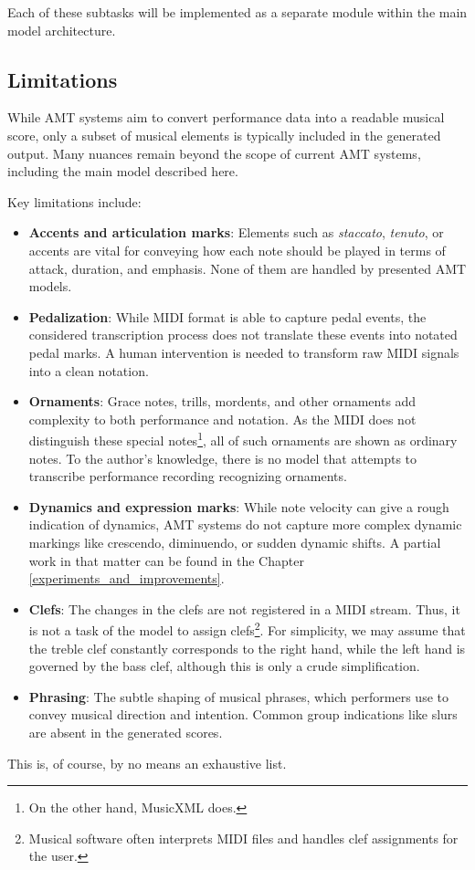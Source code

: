 Each of these subtasks will be implemented as a separate module within the main model architecture.

\subsection{Limitations}

While AMT systems aim to convert performance data into a readable musical score, only a subset of musical elements is typically included in the generated output. Many nuances remain beyond the scope of current AMT systems, including the main model described here.

Key limitations include: \begin{itemize}
	\item {\bf Accents and articulation marks}: Elements such as \emph{staccato}, \emph{tenuto}, or accents are vital for conveying how each note should be played in terms of attack, duration, and emphasis. None of them are handled by presented AMT models.
	\item {\bf Pedalization}: While MIDI format is able to capture pedal events, the considered transcription process does not translate these events into notated pedal marks. A human intervention is needed to transform raw MIDI signals into a clean notation.
	\item {\bf Ornaments}: Grace notes, trills, mordents, and other ornaments add complexity to both performance and notation. As the MIDI does not distinguish these special notes\footnote{On the other hand, MusicXML does.}, all of such ornaments are shown as ordinary notes. To the author's knowledge, there is no model that attempts to transcribe performance recording recognizing ornaments.
	\item {\bf Dynamics and expression marks}: While note velocity can give a rough indication of dynamics, AMT systems do not capture more complex dynamic markings like crescendo, diminuendo, or sudden dynamic shifts. A partial work in that matter can be found in the Chapter \ref{experiments_and_improvements}.
	\item {\bf Clefs}: The changes in the clefs are not registered in a MIDI stream. Thus, it is not a task of the model to assign clefs\footnote{Musical software often interprets MIDI files and handles clef assignments for the user.}. For simplicity, we may assume that the treble clef constantly corresponds to the right hand, while the left hand is governed by the bass clef, although this is only a crude simplification.
	\item {\bf Phrasing}: The subtle shaping of musical phrases, which performers use to convey musical direction and intention. Common group indications like slurs are absent in the generated scores. \end{itemize}

This is, of course, by no means an exhaustive list.
